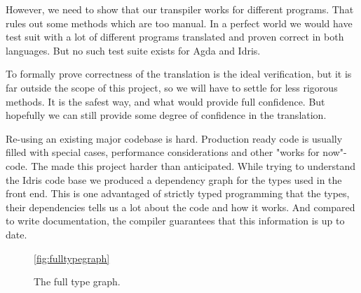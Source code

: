 

However, we need to show that our transpiler works for different programs.
That rules out some methods which are too manual.  In a perfect world we would
have test suit with a lot of different programs translated and proven correct in
both languages. But no such test suite exists for Agda and Idris.


To formally prove correctness of the translation is the ideal verification, but
it is far outside the scope of this project, so we will have to settle for less
rigorous methods. It is the safest way, and what would provide full confidence.
But hopefully we can still provide some degree of confidence in the
translation.





Re-using an existing major codebase is hard. Production ready code is usually
filled with special cases, performance considerations and other "works for
now"-code. The made this project harder than anticipated. While trying to
understand the Idris code base we produced a dependency graph for the types
used in the front end. This is one advantaged of strictly typed programming
that the types, their dependencies tells us a lot about the code and how it
works. And compared to write documentation, the compiler guarantees that this
information is up to date.


\begin{figure}\ref{fig:fulltypegraph}
  \centering
  
  \caption{The full type graph.}
\end{figure}

\clearpage


